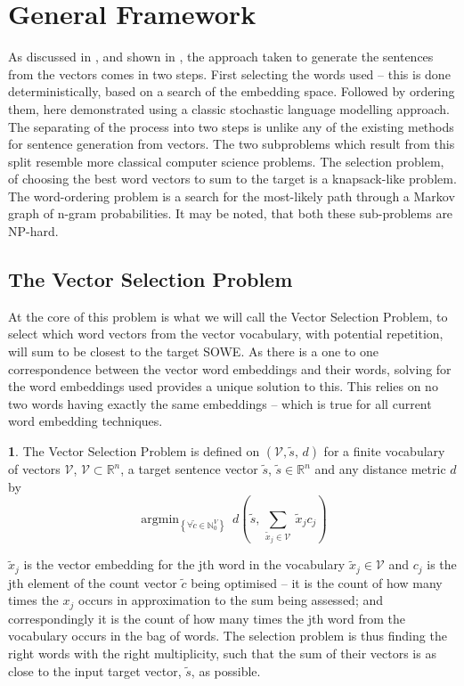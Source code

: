 \documentclass[11pt]{article}
\theoremstyle{plain}
\theoremstyle{definition}
\newtheorem{defn}[thm]{\protect\definitionname}
\providecommand{\definitionname}{Definition}
\DeclareMathOperator*{\argmin}{argmin}
\begin{document}
\section{General Framework}\label{framework}
As discussed in , and shown in , the approach taken to generate the sentences from the vectors comes in two steps. First selecting the words used -- this is done deterministically, based on a search of the embedding space. Followed by ordering them, here demonstrated using a classic stochastic language modelling approach. The separating of the process into two steps is unlike any of the existing methods for sentence generation from vectors. The two subproblems which result from this split resemble more classical computer science problems. The selection problem, of choosing the best word vectors to sum to the target is a knapsack-like problem. The word-ordering problem is a search for the most-likely path through a Markov graph of n-gram probabilities. It may be noted, that both these sub-problems are NP-hard.

\subsection{The Vector Selection Problem}

At the core of this problem is what we will call the Vector Selection Problem, to select which word vectors from the vector vocabulary, with potential repetition, will sum to be closest to the target SOWE.
As there is a one to one correspondence between the vector word embeddings and their words, solving for the word embeddings used provides a unique solution to this. This relies on no two words having exactly the same embeddings -- which is true for all current word embedding techniques.

\renewcommand{\c}{\tilde{c}}
\newcommand{\s}{\tilde{s}}
\newcommand{\x}{\tilde{x}}
\renewcommand{\t}{\tilde{t}}
\newcommand{\N}{\mathbb{N}}
\newcommand{\R}{\mathbb{R}}
\newcommand{\V}{\mathcal{V}}

\begin{defn}{The Vector Selection Problem}
	is defined on $(\V, \s,\,d)$ for a finite vocabulary of vectors $\V$, $\V\subset{\R}^{n}$, a target sentence vector $ \s$, $ \s\in\R^{n}$ and any distance metric $d$ by
		\[
		\argmin_{\left\{ \forall\c\in\N_{0}^{V}\right\} }\:d( \s,\,\sum_{\x_j\in\V}\:\x_{j}c_{j})
		\]
						
		$\x_{j}$ is the vector embedding for the jth word in the vocabulary
		$\x_{j}\in\V$ and $c_j$ is the jth element of the count vector $\c$ being optimised -- it is the count of how many times the $x_j$ occurs in approximation to the sum being assessed; and correspondingly it is the count of how many times the jth word from the vocabulary occurs in the bag of words.
		The selection problem is thus finding the right words with the right multiplicity, such that the sum of their vectors is as close to the input target vector, $\s$, as possible.
\end{defn}
\end{document}
